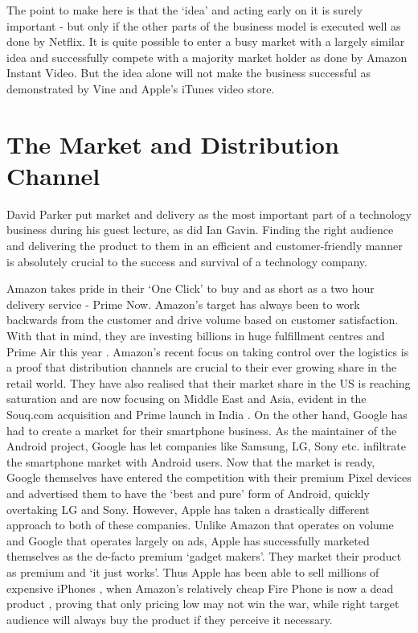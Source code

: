 \documentclass[twocolumn]{bmcart}%
\begin{document}
\par The point to make here is that the `idea' and acting early on it is surely important - but only if the other parts of the business model is executed well as done by Netflix. It is quite possible to enter a busy market with a largely similar idea and successfully compete with a majority market holder as done by Amazon Instant Video. But the idea alone will not make the business successful as demonstrated by Vine and Apple's iTunes video store.

\section*{The Market and Distribution Channel}
David Parker put market and delivery as the most important part of a technology business during his guest lecture, as did Ian Gavin. Finding the right audience and delivering the product to them in an efficient and customer-friendly manner is absolutely crucial to the success and survival of a technology company.\\

\par Amazon takes pride in their `One Click' to buy and as short as a two hour delivery service - Prime Now. Amazon's target has always been to work backwards from the customer and drive volume based on customer satisfaction. With that in mind, they are investing billions in huge fulfillment centres and Prime Air this year \cite{lesliehook2016}. Amazon's recent focus on taking control over the logistics is a proof that distribution channels are crucial to their ever growing share in the retail world. They have also realised that their market share in the US is reaching saturation and are now focusing on Middle East and Asia, evident in the Souq.com acquisition \cite{simeonkerr2017} and Prime launch in India \cite{simonmundy2016}. On the other hand, Google has had to create a market for their smartphone business. As the maintainer of the Android project, Google has let companies like Samsung, LG, Sony etc. infiltrate the smartphone market with Android users. Now that the market is ready, Google themselves have entered the competition with their premium Pixel devices and advertised them to have the `best and pure' form of Android, quickly overtaking LG and Sony. However, Apple has taken a drastically different approach to both of these companies. Unlike Amazon that operates on volume and Google that operates largely on ads, Apple has successfully marketed themselves as the de-facto premium `gadget makers'. They market their product as premium and `it just works'. Thus Apple has been able to sell millions of expensive iPhones \cite{tessstynes2015}, when Amazon's relatively cheap Fire Phone is now a dead product \cite{jacobkastrenakes2015}, proving that only pricing low may not win the war, while right target audience will always buy the product if they perceive it necessary.\\
\end{document}
